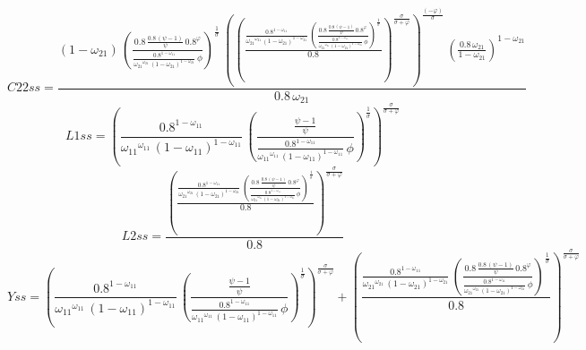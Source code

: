 \begin{dmath*}
C22ss = \frac{\left(1-{{\omega_{21}}}\right)\, \left(\frac{0.8\, \frac{0.8\, \left({{\psi}}-1\right)}{{{\psi}}}\, 0.8^{{{\varphi}}}}{\frac{0.8^{1-{{\omega_{11}}}}}{{{\omega_{21}}}^{{{\omega_{21}}}}\, \left(1-{{\omega_{21}}}\right)^{1-{{\omega_{21}}}}}\, {{\phi}}}\right)^{\frac{1}{{{\sigma}}}}\, \left(\left(\frac{\frac{0.8^{1-{{\omega_{11}}}}}{{{\omega_{21}}}^{{{\omega_{21}}}}\, \left(1-{{\omega_{21}}}\right)^{1-{{\omega_{21}}}}}\, \left(\frac{0.8\, \frac{0.8\, \left({{\psi}}-1\right)}{{{\psi}}}\, 0.8^{{{\varphi}}}}{\frac{0.8^{1-{{\omega_{11}}}}}{{{\omega_{21}}}^{{{\omega_{21}}}}\, \left(1-{{\omega_{21}}}\right)^{1-{{\omega_{21}}}}}\, {{\phi}}}\right)^{\frac{1}{{{\sigma}}}}}{0.8}\right)^{\frac{{{\sigma}}}{{{\sigma}}+{{\varphi}}}}\right)^{\frac{\left(-{{\varphi}}\right)}{{{\sigma}}}}\, \left(\frac{0.8\, {{\omega_{21}}}}{1-{{\omega_{21}}}}\right)^{1-{{\omega_{21}}}}}{0.8\, {{\omega_{21}}}}
\end{dmath*}
\begin{dmath*}
L1ss = \left(\frac{0.8^{1-{{\omega_{11}}}}}{{{\omega_{11}}}^{{{\omega_{11}}}}\, \left(1-{{\omega_{11}}}\right)^{1-{{\omega_{11}}}}}\, \left(\frac{\frac{{{\psi}}-1}{{{\psi}}}}{\frac{0.8^{1-{{\omega_{11}}}}}{{{\omega_{11}}}^{{{\omega_{11}}}}\, \left(1-{{\omega_{11}}}\right)^{1-{{\omega_{11}}}}}\, {{\phi}}}\right)^{\frac{1}{{{\sigma}}}}\right)^{\frac{{{\sigma}}}{{{\sigma}}+{{\varphi}}}}
\end{dmath*}
\begin{dmath*}
L2ss = \frac{\left(\frac{\frac{0.8^{1-{{\omega_{11}}}}}{{{\omega_{21}}}^{{{\omega_{21}}}}\, \left(1-{{\omega_{21}}}\right)^{1-{{\omega_{21}}}}}\, \left(\frac{0.8\, \frac{0.8\, \left({{\psi}}-1\right)}{{{\psi}}}\, 0.8^{{{\varphi}}}}{\frac{0.8^{1-{{\omega_{11}}}}}{{{\omega_{21}}}^{{{\omega_{21}}}}\, \left(1-{{\omega_{21}}}\right)^{1-{{\omega_{21}}}}}\, {{\phi}}}\right)^{\frac{1}{{{\sigma}}}}}{0.8}\right)^{\frac{{{\sigma}}}{{{\sigma}}+{{\varphi}}}}}{0.8}
\end{dmath*}
\begin{dmath*}
Yss = \left(\frac{0.8^{1-{{\omega_{11}}}}}{{{\omega_{11}}}^{{{\omega_{11}}}}\, \left(1-{{\omega_{11}}}\right)^{1-{{\omega_{11}}}}}\, \left(\frac{\frac{{{\psi}}-1}{{{\psi}}}}{\frac{0.8^{1-{{\omega_{11}}}}}{{{\omega_{11}}}^{{{\omega_{11}}}}\, \left(1-{{\omega_{11}}}\right)^{1-{{\omega_{11}}}}}\, {{\phi}}}\right)^{\frac{1}{{{\sigma}}}}\right)^{\frac{{{\sigma}}}{{{\sigma}}+{{\varphi}}}}+\left(\frac{\frac{0.8^{1-{{\omega_{11}}}}}{{{\omega_{21}}}^{{{\omega_{21}}}}\, \left(1-{{\omega_{21}}}\right)^{1-{{\omega_{21}}}}}\, \left(\frac{0.8\, \frac{0.8\, \left({{\psi}}-1\right)}{{{\psi}}}\, 0.8^{{{\varphi}}}}{\frac{0.8^{1-{{\omega_{11}}}}}{{{\omega_{21}}}^{{{\omega_{21}}}}\, \left(1-{{\omega_{21}}}\right)^{1-{{\omega_{21}}}}}\, {{\phi}}}\right)^{\frac{1}{{{\sigma}}}}}{0.8}\right)^{\frac{{{\sigma}}}{{{\sigma}}+{{\varphi}}}}
\end{dmath*}
